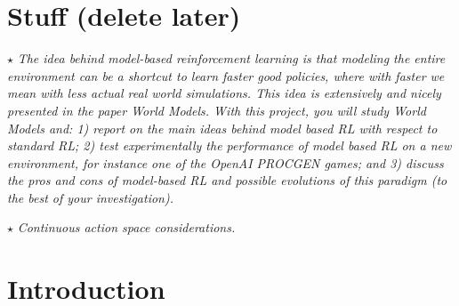 \documentclass{article}
\begin{document}

\printAffiliationsAndNotice{}


\section*{Stuff (delete later)}

$\star$ \emph{The idea behind model-based reinforcement learning is
that modeling the entire environment can be a shortcut to
learn faster good policies, where with faster we mean with
less actual real world simulations. This idea is extensively
and nicely presented in the paper World Models. With this
project, you will study World Models and: 1) report on the
main ideas behind model based RL with respect to
standard RL; 2) test experimentally the performance of
model based RL on a new environment, for instance one of
the OpenAI PROCGEN games; and 3) discuss the pros
and cons of model-based RL and possible evolutions of
this paradigm (to the best of your investigation).}

%
$\star$ \emph{Continuous action space considerations.}



\section{Introduction}
\end{document}
